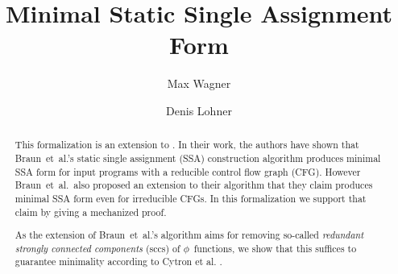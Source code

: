 \documentclass[11pt,a4paper]{article}
\begin{document}
\title{Minimal Static Single Assignment Form}
\author{Max Wagner\and Denis Lohner}
\maketitle

\newcommand\pf{$\phi$~function}

\begin{abstract}
This formalization is an extension to \cite{Formal_SSA-AFP}.
In their work, the authors have shown that Braun~et~al.'s static single assignment (SSA) construction algorithm \cite{braun13cc} produces minimal SSA form for input programs with a reducible control flow graph (CFG).
However Braun~et~al.\ also proposed an extension to their algorithm that they claim produces minimal SSA form even for irreducible CFGs.
In this formalization we support that claim by giving a mechanized proof.

As the extension of Braun~et~al.'s algorithm aims for removing so-called \emph{redundant strongly connected components} (sccs) of \pf s, we show that this suffices to guarantee minimality according to Cytron et al. \cite{cytron91}.
\end{abstract}

\tableofcontents





\end{document}
